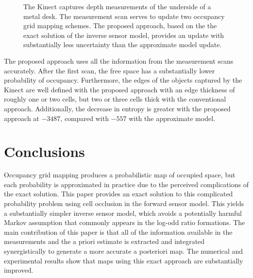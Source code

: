 \documentclass[letterpaper, 10pt, conference]{ieeeconf}
\begin{document}
\begin{figure}
{{	}
}
\caption{The Kinect captures depth measurements of the underside of a metal desk. The measurement scan serves to update two occupancy grid mapping schemes. The proposed approach, based on the the exact solution of the inverse sensor model, provides an update with substantially less uncertainty than the approximate model update.}\label{fig:ExpRes}
\end{figure}

The proposed approach uses all the information from the measurement scans accurately. After the first scan, the free space has a substantially lower probability of occupancy. Furthermore, the edges of the objects captured by the Kinect are well defined with the proposed approach with an edge thickness of roughly one or two cells, but two or three cells thick with the conventional approach. Additionally, the decrease in entropy is greater with the proposed approach at $-3487$, compared with $-557$ with the approximate model.


\section{Conclusions}

Occupancy grid mapping produces a probabilistic map of occupied space, but each probability is approximated in practice due to the perceived complications of the exact solution.
This paper provides an exact solution to this complicated probability problem using cell occlusion in the forward sensor model. This yields a substantially simpler inverse sensor model, which avoids a potentially harmful Markov assumption that commonly appears in the log-odd ratio formations. The main contribution of this paper is that all of the information available in the measurements and the a priori estimate is extracted and integrated synergistically to generate a more accurate a posteriori map. The numerical and experimental results show that maps using this exact approach are substantially improved. %
	
\end{document}
